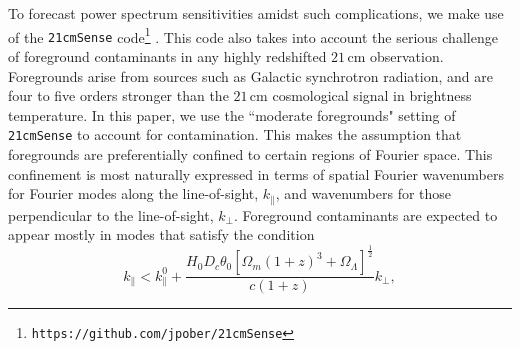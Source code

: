 \documentclass[twocolumn,aps,prd,nofootinbib,showpacs]{revtex4-1}
\begin{document}
To forecast power spectrum sensitivities amidst such complications, we make use of the {\tt 21cmSense} code\footnote{{\tt https://github.com/jpober/21cmSense}} \cite{pober_et_al2013,pober_et_al2014}. This code also takes into account the serious challenge of foreground contaminants in any highly redshifted $21\,\textrm{cm}$ observation. Foregrounds arise from sources such as Galactic synchrotron radiation, and are four to five orders stronger than the $21\,\textrm{cm}$ cosmological signal in brightness temperature. In this paper, we use the ``moderate foregrounds" setting of {\tt 21cmSense} to account for contamination. This makes the assumption that foregrounds are preferentially confined to certain regions of Fourier space. This confinement is most naturally expressed in terms of spatial Fourier wavenumbers for Fourier modes along the line-of-sight, $k_\parallel$, and wavenumbers for those perpendicular to the line-of-sight, $k_\perp$. Foreground contaminants are expected to appear mostly in modes that satisfy the condition 
\begin{equation}
\label{eq:Wedge}
k_\parallel < k_\parallel^0 + \frac{H_0 D_c \theta_0 \left[\Omega_m (1+z)^3 + \Omega_\Lambda\right]^\frac{1}{2}}{c (1+z)} k_\perp,
\end{equation}
\end{document}
